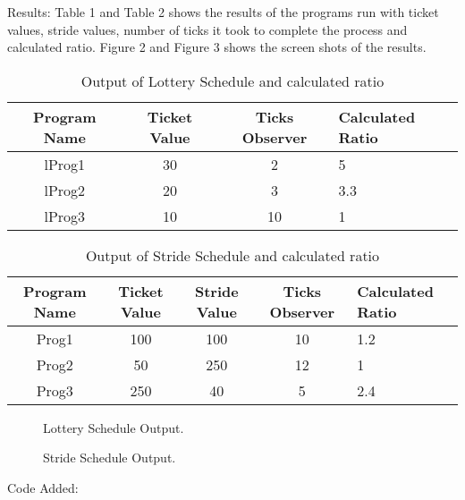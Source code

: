 \documentclass[a4paper, 10pt]{article}
\begin{document}
Results:
Table 1 and Table 2 shows the results of the programs run with ticket values, stride values, number of ticks it took to complete the process and calculated ratio. Figure 2 and Figure 3 shows the screen shots of the results. \\
\newpage
\begin{table}
	\centering
	\caption{Output of Lottery Schedule and calculated ratio}
	\begin{tabular}{|c|c|c|l|} \hline
		Program Name&Ticket Value&Ticks Observer&Calculated Ratio\\ \hline
		lProg1&30&2&5\\ \hline
		lProg2&20&3&3.3\\ \hline
		lProg3&10&10&1\\ \hline
	\end{tabular}
\end{table}
\begin{table}
	\centering
	\caption{Output of Stride Schedule and calculated ratio}
	\begin{tabular}{|c|c|c|c|l|} \hline
		Program Name&Ticket Value&Stride Value&Ticks Observer&Calculated Ratio\\ \hline
		Prog1&100&100&10&1.2\\ \hline
		Prog2&50&250&12&1\\ \hline
		Prog3&250&40&5&2.4\\ \hline
	\end{tabular}
\end{table}
\begin{figure}
	\centering
	\caption{Lottery Schedule Output.}
\end{figure}

\begin{figure}
	\centering
	\caption{Stride Schedule Output.}
\end{figure}
Code Added:
\end{document}
